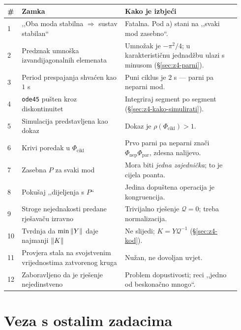 \begin{longtable}{@{}p{0.05\linewidth} p{0.42\linewidth} p{0.47\linewidth}@{}}
\toprule
\textbf{\#} & \textbf{Zamka} & \textbf{Kako je izbjeći} \\
\midrule
\endhead
1 & ,,Oba moda stabilna $\Rightarrow$ sustav stabilan`` & Fatalna. Pod a) stani na
,,svaki mod zasebno``. \\[5pt]
2 & Predznak umnoška izvandijagonalnih elemenata & Umnožak je $-\pi^2/4$; u
karakterističnu jednadžbu ulazi s minusom (\S\ref{sec:z4-parni}). \\[5pt]
3 & Period prespajanja shvaćen kao $1$ s & Puni ciklus je $2$ s --- parni pa
neparni mod. \\[5pt]
4 & \texttt{ode45} pušten kroz diskontinuitet & Integriraj segment po segment
(\S\ref{sec:z4-kako-simulirati}). \\[5pt]
5 & Simulacija predstavljena kao dokaz & Dokaz je $\rho(\Phi_{\mathrm{cikl}}) > 1$. \\[5pt]
6 & Krivi poredak u $\Phi_{\mathrm{cikl}}$ & Prvo parni pa neparni znači
$\Phi_{\mathrm{nep}}\Phi_{\mathrm{par}}$, zdesna nalijevo. \\[5pt]
7 & Zasebna $P$ za svaki mod & Mora biti \emph{jedna zajednička}; to je cijela
poanta. \\[5pt]
8 & Pokušaj ,,dijeljenja s $P$`` & Jedina dopuštena operacija je kongruencija. \\[5pt]
9 & Stroge nejednakosti predane rješavaču izravno & Trivijalno rješenje
$\mathcal{Q} = 0$; treba normalizacija. \\[5pt]
10 & Tvrdnja da $\min\left\lVert Y \right\rVert$ daje najmanji $\left\lVert K \right\rVert$ & Ne slijedi;
$K = Y\mathcal{Q}^{-1}$ (\S\ref{sec:z4-kod}). \\[5pt]
11 & Provjera stala na svojstvenim vrijednostima zatvorenog kruga & Nužan, ne
dovoljan uvjet. \\[5pt]
12 & Zaboravljeno da je rješenje nejedinstveno & Problem dopustivosti; reci
,,jedno od beskonačno mnogo``. \\
\bottomrule
\end{longtable}

\section{Veza s ostalim zadacima}
\label{sec:z4o-veze}

